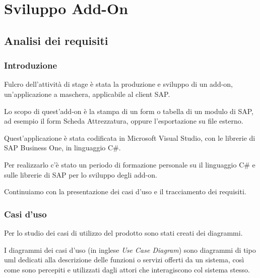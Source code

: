
\chapter{Sviluppo Add-On}
\label{cap:sviluppo-addon}



\section{Analisi dei requisiti}
\subsection{Introduzione}

\begin{flushleft}
	\item Fulcro dell'attività di stage è stata la produzione e sviluppo di un add-on, un'applicazione a maschera, applicabile al client SAP.
	
	Lo scopo di quest'add-on è la stampa di un form o tabella di un modulo di SAP, ad esempio il form Scheda Attrezzatura, oppure l'esportazione su file esterno.
	\item Quest'applicazione è stata codificata in Microsoft Visual Studio, con le librerie di SAP Business One, in linguaggio C\#.
	
	Per realizzarlo c'è stato un periodo di formazione personale su il linguaggio C\# e sulle librerie di SAP per lo sviluppo degli add-on.
\end{flushleft}
\vspace{1em}


Continuiamo con la presentazione dei casi d'uso e il tracciamento dei requisiti.
\newpage

\subsection{Casi d'uso}
\begin{flushleft}
	Per lo studio dei casi di utilizzo del prodotto sono stati creati dei diagrammi.
	
	I diagrammi dei casi d'uso (in inglese \emph{Use Case Diagram}) sono diagrammi di tipo \gls{uml} dedicati alla descrizione delle funzioni o servizi offerti da un sistema, così come sono percepiti e utilizzati dagli attori che interagiscono col sistema stesso.
\end{flushleft}


